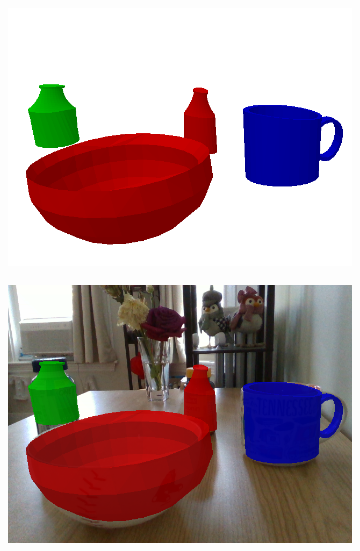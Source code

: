 \documentclass{article}
\begin{document}
\begin{figure}[]
\begin{subfigure}{(\linewidth - 0.05\linewidth)/5}
        \includegraphics[width=\linewidth]{figures/real2sim2real/5/3_sim.png}
        \caption{}
    \end{subfigure}
    \begin{subfigure}{(\linewidth - 0.05\linewidth)/5}
        \centering
        \includegraphics[width=\linewidth]{figures/real2sim2real/5/3.png}
        \caption{}
    \end{subfigure}
    \begin{subfigure}{(\linewidth - 0.05\linewidth)/5}
        \centering

\end{subfigure}
\end{figure}
\end{document}
